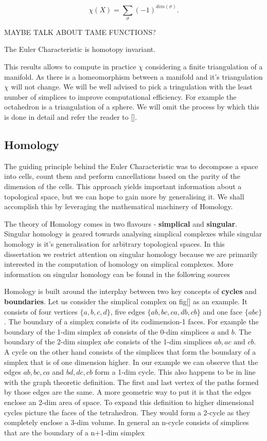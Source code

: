 $$ \chi(X) = \sum_{\sigma}{(-1)^{dim(\sigma)}} .$$

MAYBE TALK ABOUT TAME FUNCTIONS?


\begin{lem}   The Euler Characteristic is homotopy invariant. \end{lem}

This results allows to compute in practice $\chi$ considering a finite triangulation of a manifold. As there is a homeomorphism between a manifold and it's triangulation $\chi$ will not change. We will be well advised to pick a tringulation with the least number of simplices to improve computational efficiency. For example the octahedron is a triangulation of a sphere. We will omit the process by which this is done in detail and refer the reader to [].

\subsection{Homology}

The guiding principle behind the Euler Characteristic was to decompose a space into cells, count them and perform cancellations based on the parity of the dimension of the cells. This approach yields important information about a topological space, but we can hope to gain more by generalising it. We shall accomplish this by leveraging the mathematical machinery of Homology.

The theory of Homology comes in two flavours - \textbf{simplical} and \textbf{singular}. Singular homology is geared towards analysing simplical complexes while singular homology is it's generalisation for arbitrary topological spaces. In this dissertation we restrict attention on singular homology because we are primarily interested in the computation of homology on simplical complexes. More information on singular homology can be found in the following sources \cite{algebraic-topology, elementary-applied-topology}


Homology is built around the interplay between two key concepts of \textbf{cycles} and \textbf{boundaries}. Let us consider the simplical complex on fig[] as an example. It consists of four vertices $\{a, b, c, d\}$, five edges $\{ab, bc, ca, db, cb\}$ and one face $\{abc\}$. The boundary of a simplex consists of its codimension-1 faces. For example the boundary of the 1-dim simplex $ab$ consists of the 0-dim simplices $a \text{ and } b$. The boundary of the 2-dim simplex $abc$ consists of the 1-dim simplices $ab, ac \text{ and } cb$. A cycle on the other hand consists of the simplices that form the boundary of a simplex that is of one dimension higher. In our example we can observe that the edges $ab, bc, ca$ and $bd, dc, cb$ form a 1-dim cycle.  This also happens to be in line with the graph theoretic definition. The first and last vertex of the paths formed by those edges are the same. A more geometric way to put it is that the edges enclose an 2-dim area of space.  To expand this definition to higher dimensional cycles picture the faces of the tetrahedron. They would form a 2-cycle as they completely enclose a 3-dim volume. In general an n-cycle consists of simplices that are the boundary of a n+1-dim simplex

